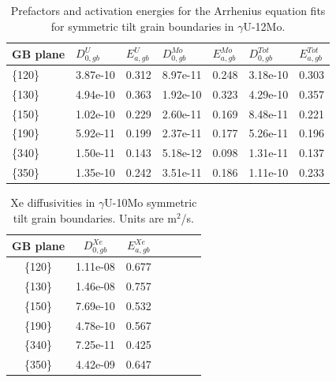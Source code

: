 \documentclass{elsarticle}
\begin{document}
\begin{appendices}
\begin{table}[!ht]
\centering
\caption{Prefactors and activation energies for the Arrhenius equation fits for symmetric tilt grain boundaries in $\gamma$U-12Mo.}
\label{tab:u12mo}
\begin{tabular}{lllllll}
\toprule
GB plane & $D_{0,gb}^U$      & $E_{a,gb}^U$
	 & $D_{0,gb}^{Mo}$   & $E_{a,gb}^{Mo}$
	 & $D_{0,gb}^{Tot}$  & $E_{a,gb}^{Tot}$ \\
\midrule
\{120\}
	 & 3.87e-10 & 0.312
	 & 8.97e-11 & 0.248
	 & 3.18e-10 & 0.303 \\
\{130\}
	 & 4.94e-10 & 0.363
	 & 1.92e-10 & 0.323
	 & 4.29e-10 & 0.357 \\
\{150\}
	 & 1.02e-10 & 0.229
	 & 2.60e-11 & 0.169
	 & 8.48e-11 & 0.221 \\
\{190\}
	 & 5.92e-11 & 0.199
	 & 2.37e-11 & 0.177
	 & 5.26e-11 & 0.196 \\
\{340\}
	 & 1.50e-11 & 0.143
	 & 5.18e-12 & 0.098
	 & 1.31e-11 & 0.137 \\
\{350\}
	 & 1.35e-10 & 0.242
	 & 3.51e-11 & 0.186
	 & 1.11e-10 & 0.233 \\
\bottomrule
\end{tabular}
\end{table}

\begin{table}[!ht]
\centering
\caption{Xe diffusivities in $\gamma$U-10Mo symmetric tilt grain boundaries. Units are m$^2$/s.}
\label{tab:xe}
\begin{tabular}{ccccccc}
\toprule
GB plane & $D_{0,gb}^{Xe}$      & $E_{a,gb}^{Xe}$ \\
\midrule
\{120\} & 1.11e-08 & 0.677 \\
\{130\} & 1.46e-08 & 0.757 \\
\{150\} & 7.69e-10 & 0.532 \\
\{190\} & 4.78e-10 & 0.567 \\
\{340\} & 7.25e-11 & 0.425 \\
\{350\} & 4.42e-09 & 0.647 \\
\bottomrule
\end{tabular}
\end{table}

\end{appendices}


\FloatBarrier


\end{document}
